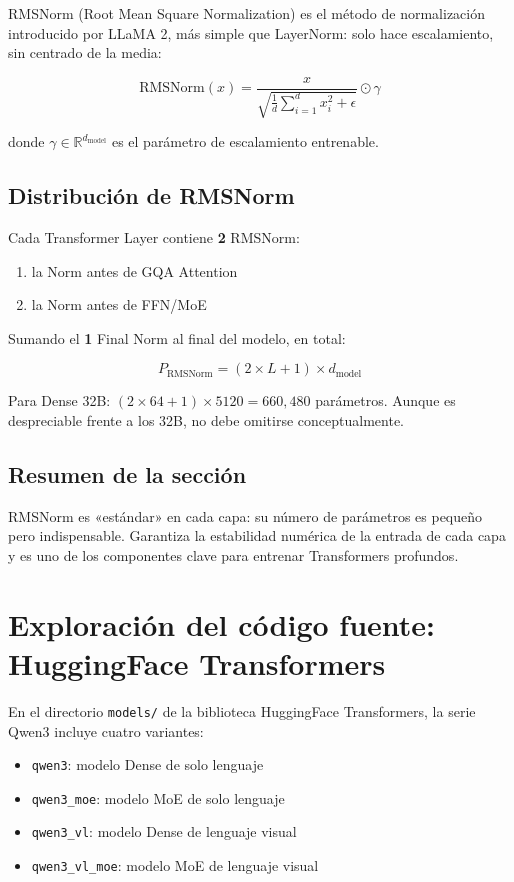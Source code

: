 \documentclass[a4paper]{article}
\begin{document}
RMSNorm (Root Mean Square Normalization) es el método de normalización introducido por LLaMA 2, más simple que LayerNorm: solo hace escalamiento, sin centrado de la media:

$$
\text{RMSNorm}(x) = \frac{x}{\sqrt{\frac{1}{d}\sum_{i=1}^d x_i^2 + \epsilon}} \odot \gamma
$$

donde $\gamma \in \mathbb{R}^{d_{\text{model}}}$ es el parámetro de escalamiento entrenable.

\subsection{Distribución de RMSNorm}

Cada Transformer Layer contiene \textbf{2} RMSNorm:
\begin{enumerate}
  \item la Norm antes de GQA Attention
  \item la Norm antes de FFN/MoE
\end{enumerate}

Sumando el \textbf{1} Final Norm al final del modelo, en total:

$$
P_{\text{RMSNorm}} = (2 \times L + 1) \times d_{\text{model}}
$$

Para Dense 32B: $(2 \times 64 + 1) \times 5120 = 660{,}480$ parámetros. Aunque es despreciable frente a los 32B, no debe omitirse conceptualmente.

\subsection{Resumen de la sección}

RMSNorm es «estándar» en cada capa: su número de parámetros es pequeño pero indispensable. Garantiza la estabilidad numérica de la entrada de cada capa y es uno de los componentes clave para entrenar Transformers profundos.

\section{Exploración del código fuente: HuggingFace Transformers}

En el directorio \texttt{models/} de la biblioteca HuggingFace Transformers, la serie Qwen3 incluye cuatro variantes:
\begin{itemize}
  \item \texttt{qwen3}: modelo Dense de solo lenguaje
  \item \texttt{qwen3\_moe}: modelo MoE de solo lenguaje
  \item \texttt{qwen3\_vl}: modelo Dense de lenguaje visual
  \item \texttt{qwen3\_vl\_moe}: modelo MoE de lenguaje visual
\end{itemize}
\end{document}
